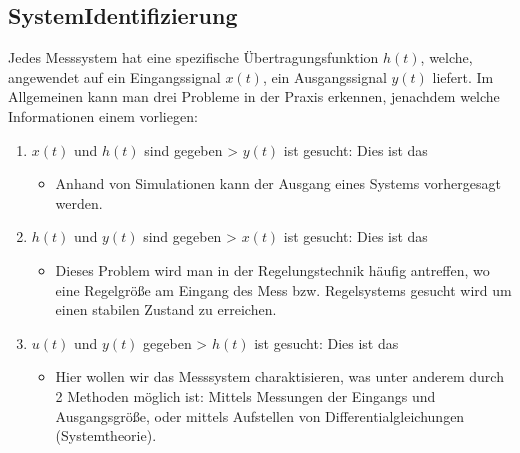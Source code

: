 \documentclass[letterpaper,10pt,english]{jupyterBook}
\begin{document}
\sphinxAtStartPar
{}


\subsection{System\sphinxhyphen{}Identifizierung}
\label{\detokenize{content/5_LTI:system-identifizierung}}
\sphinxAtStartPar


\sphinxAtStartPar
Jedes Messsystem hat eine spezifische Übertragungsfunktion \(h(t)\), welche, angewendet auf ein Eingangssignal \(x(t)\), ein Ausgangssignal \(y(t)\) liefert. Im Allgemeinen kann man drei Probleme in der Praxis erkennen, jenachdem welche Informationen einem vorliegen:
\begin{enumerate}
%
\item {} 
\sphinxAtStartPar
\(x(t)\) und \(h(t)\) sind gegeben \sphinxhyphen{}> \(y(t)\) ist gesucht: Dies ist das 
\begin{itemize}
\item {} 
\sphinxAtStartPar
Anhand von Simulationen kann der Ausgang eines Systems vorhergesagt werden.

\end{itemize}

\item {} 
\sphinxAtStartPar
\(h(t)\) und \(y(t)\) sind gegeben \sphinxhyphen{}> \(x(t)\) ist gesucht: Dies ist das 
\begin{itemize}
\item {} 
\sphinxAtStartPar
Dieses Problem wird man in der Regelungstechnik häufig antreffen, wo eine Regelgröße am Eingang des Mess\sphinxhyphen{} bzw. Regelsystems gesucht wird um einen stabilen Zustand zu erreichen.

\end{itemize}

\item {} 
\sphinxAtStartPar
\(u(t)\) und \(y(t)\) gegeben \sphinxhyphen{}> \(h(t)\) ist gesucht: Dies ist das 
\begin{itemize}
\item {} 
\sphinxAtStartPar
Hier wollen wir das Messsystem charaktisieren, was unter anderem durch 2 Methoden möglich ist: Mittels Messungen der Eingangs\sphinxhyphen{} und Ausgangsgröße, oder mittels Aufstellen von Differentialgleichungen (Systemtheorie).

\end{itemize}

\end{enumerate}
\end{document}

